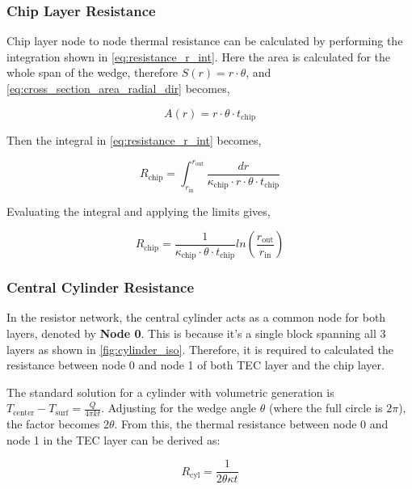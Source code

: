 \documentclass[10pt,a4paper,twocolumn]{article}
\begin{document}
\subsubsection{Chip Layer Resistance}

Chip layer node to node thermal resistance can be calculated by performing the integration shown in \cref{eq:resistance_r_int}. Here the area is calculated for the whole span of the wedge, therefore $S(r) = r\cdot\theta$, and \cref{eq:cross_section_area_radial_dir} becomes,

\begin{equation*}
  A(r) =  r\cdot\theta\cdot t_{\text{chip}}
\end{equation*}

Then the integral in \cref{eq:resistance_r_int} becomes,

\begin{equation*}
  R_{\text{chip}} = \int_{r_{\text{in}}}^{r_{\text{out}}} \frac{dr}{\kappa_{\text{chip}} \cdot r\cdot\theta\cdot t_{\text{chip}}}
\end{equation*}

Evaluating the integral and applying the limits gives,

\begin{equation}
  R_{\text{chip}} = \frac{1}{\kappa_{\text{chip}} \cdot\theta\cdot t_{\text{chip}}}ln\left( \frac{r_{\text{out}}}{r_{\text{in}}}\right)
\end{equation}

\subsubsection{Central Cylinder Resistance}

In the resistor network, the central cylinder acts as a common node for both layers, denoted by \textbf{Node 0}. This is because it's a single block spanning all 3 layers as shown in \cref{fig:cylinder_iso}. Therefore, it is required to calculated the resistance between node 0 and node 1 of both TEC layer and the chip layer.

The standard solution for a cylinder with volumetric generation is $T_{\text{center}} - T_{\text{surf}} = \frac{Q}{4\pi k t}$. Adjusting for the wedge angle $\theta$ (where the full circle is $2\pi$), the factor becomes $2\theta$. From this, the thermal resistance between node 0 and node 1 in the TEC layer can be derived as:

\begin{equation}
  R_{\text{cyl}} = \frac{1}{2\theta \kappa t}
  \label{eq:cyl_Resistance1}
\end{equation}
\end{document}
